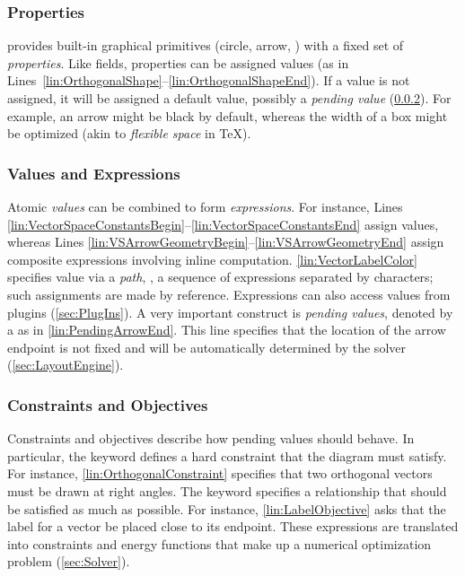 \subsubsection{Properties}
\label{sec:Properties}

\Style{} provides built-in graphical primitives (circle, arrow, \etc{}) with a fixed set of \emph{properties}. Like fields, properties can be assigned values (as in Lines~\ref{lin:OrthogonalShape}--\ref{lin:OrthogonalShapeEnd}). If a value is not assigned, it will be assigned a default value, possibly a \emph{pending value} (\cref{sec:ValuesAndExpressions}).  For example, an arrow might be black by default, whereas the width of a box might be optimized (akin to \emph{flexible space} in \TeX).


\subsubsection{Values and Expressions}
\label{sec:ValuesAndExpressions}

Atomic \emph{values} can be combined to form \emph{expressions}.  For instance, Lines \ref{lin:VectorSpaceConstantsBegin}--\ref{lin:VectorSpaceConstantsEnd} assign values, whereas Lines \ref{lin:VSArrowGeometryBegin}--\ref{lin:VSArrowGeometryEnd} assign composite expressions involving inline computation.  \cref{lin:VectorLabelColor} specifies value via a \emph{path}, \ie, a sequence of expressions separated by  characters; such assignments are made by reference.  Expressions can also access values from plugins (\cref{sec:PlugIns}).  A very important construct is \emph{pending values}, denoted by a  as in \cref{lin:PendingArrowEnd}.  This line specifies that the location of the arrow endpoint is not fixed and will be automatically determined by the solver (\cref{sec:LayoutEngine}).

\subsubsection{Constraints and Objectives}
\label{sec:ConstraintsAndObjectives}

Constraints and objectives describe how pending values should behave.  In particular, the  keyword defines a hard constraint that the diagram must satisfy. For instance, \cref{lin:OrthogonalConstraint} specifies that two orthogonal vectors must be drawn at right angles.  The  keyword specifies a relationship that should be satisfied as much as possible. For instance, \cref{lin:LabelObjective} asks that the label for a vector be placed close to its endpoint. These expressions are translated into constraints and energy functions that make up a numerical optimization problem (\cref{sec:Solver}).


